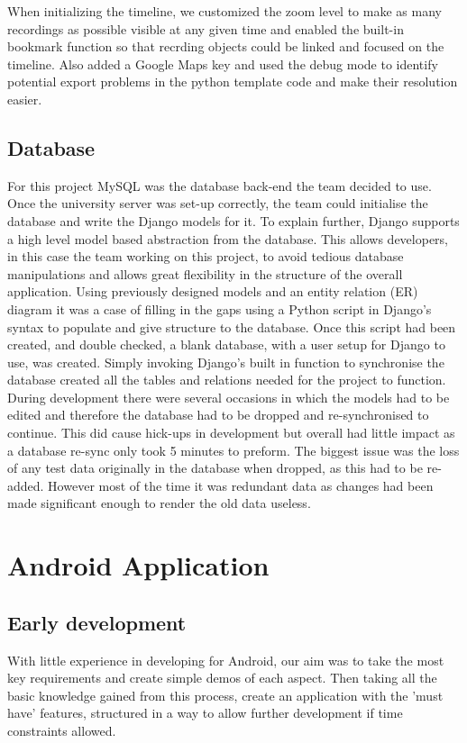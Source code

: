 \documentclass{l3proj}
\begin{document}
When initializing the timeline, we customized the zoom level to make as many recordings as possible visible at any given time and enabled the built-in bookmark function so that recrding objects could be linked and focused on the timeline. Also added a Google Maps key and used the debug mode to identify potential export problems in the python template code and make their resolution easier.


\subsection{Database}
For this project MySQL was the database back-end the team decided to use.
Once the university server was set-up correctly, the team could initialise the database and write the Django models for it. To explain further, Django supports a high level model based abstraction from the database. This allows developers, in this case the team working on this project, to avoid tedious database manipulations and allows great flexibility in the structure of the overall application.
Using previously designed models and an entity relation (ER) diagram it was a case of filling in the gaps using a Python script in Django's syntax to populate and give structure to the database.
Once this script had been created, and double checked, a blank database, with a user setup for Django to use, was created. Simply invoking Django's built in function to synchronise the database created all the tables and relations needed for the project to function.
During development there were several occasions in which the models had to be edited and therefore the database had to be dropped and re-synchronised to continue. This did cause hick-ups in development but overall had little impact as a database re-sync only took 5 minutes to preform. The biggest issue was the loss of any test data originally in the database when dropped, as this had to be re-added. However most of the time it was redundant data as changes had been made significant enough to render the old data useless.




\section{Android Application}

\subsection{Early development} With little experience in developing for Android, our aim was to take the most key requirements and create simple demos of each aspect. Then taking all the basic knowledge gained from this process, create an application with the 'must have' features, structured in a way to allow further development if time constraints allowed.
\end{document}
